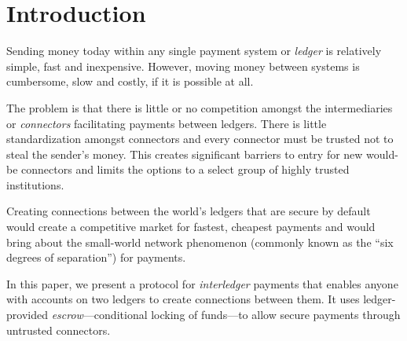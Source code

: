 \documentclass[letterpaper,twocolumn,10pt]{article}
\begin{document}
\section{Introduction}


Sending money today within any single payment system or \textit{ledger} is relatively simple, fast and inexpensive. However, moving money between systems is cumbersome, slow and costly, if it is possible at all. 

The problem is that there is little or no competition amongst the intermediaries or \textit{connectors} facilitating payments between ledgers. There is little standardization amongst connectors and every connector must be trusted not to steal the sender's money. This creates significant barriers to entry for new would-be connectors and limits the options to a select group of highly trusted institutions.


Creating connections between the world's ledgers that are secure
by default would create a competitive market for fastest, cheapest payments and would  
bring about the small-world network phenomenon (commonly known as the ``six degrees of separation'') for payments. \cite{watts1998collective}\cite{albert1999internet}

In this paper, we present a protocol for \mbox{\textit{interledger}} payments that enables anyone with accounts on two ledgers to create connections between them. It uses ledger-provided \textit{escrow}---conditional locking of funds---to allow secure payments through untrusted connectors.
\end{document}
